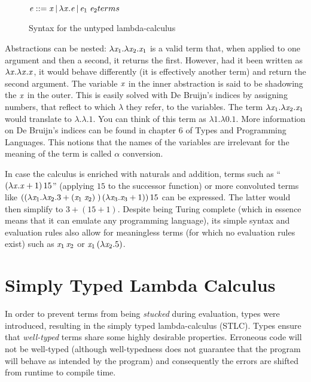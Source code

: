 \begin{figure}
  \centering
  $\term ::= \tmVar\,|\,\lambda \tmVar.\term\,|\,\term_1 \; \term_2  \hfill terms $\\
  \caption{Syntax for the untyped lambda-calculus}
  \label{untypedsyntax}
\end{figure}
Abstractions can be nested: $\lambda \mathit{x}_1. \lambda \mathit{x}_2 .\mathit{x}_1$ is a valid term that, when applied to one argument and then a second, it returns the first. However, had it been written as $\lambda \mathit{x}. \lambda \mathit{x}. \mathit{x}$, it would behave differently (it is effectively another term) and return the second argument. The variable $\mathit{x}$ in the inner abstraction is said to be shadowing the $\mathit{x}$ in the outer. This is easily solved with De Bruijn's indices by assigning numbers, that reflect to which $\lambda$ they refer, to the variables. The term $\lambda \mathit{x}_1. \lambda \mathit{x}_2 .\mathit{x}_1$ would translate to $\lambda .\lambda.1$. You can think of this term as $\lambda 1.\lambda 0.1$. More information on De Bruijn's indices can be found in chapter 6 of Types and Programming Languages\cite{tapl}. This notions that the names of the variables are irrelevant for the meaning of the term is called $\alpha$ conversion.

In case the calculus is enriched with naturals and addition, terms such as ``$(\lambda \mathit{x}.\mathit{x} + 1)\,15$'' (applying $15$ to the successor function) or more convoluted terms like $((\lambda \mathit{x}_1. \lambda \mathit{x}_2 .3 + (\mathit{x}_1\;\mathit{x}_2)\;) \, (\lambda \mathit{x}_3.\mathit{x}_3 + 1))\,15$ can be expressed. The latter would then simplify to $3+(15+1)$. Despite being Turing complete (which in essence means that it can emulate any programming language), its simple syntax and evaluation rules also allow for meaningless terms (for which no evaluation rules exist) such as $\mathit{x}_1 \, \mathit{x}_2$ or $\mathit{x}_1 \, (\lambda \mathit{x}_2.5)$.

\section{Simply Typed Lambda Calculus}
In order to prevent terms from being \textit{stucked} during evaluation, types were introduced, resulting in the simply typed lambda-calculus (STLC). Types ensure that \textit{well-typed} terms share some highly desirable properties. Erroneous code will not be well-typed (although well-typedness does not guarantee that the program will behave as intended by the program) and consequently the errors are shifted from runtime to compile time.
